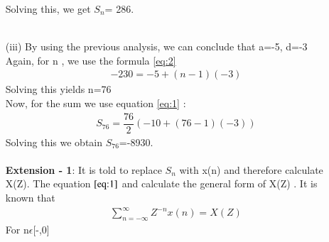 \documentclass[journal,12pt,twocolumn]{IEEEtran}
\theoremstyle{remark}
\begin{document}
\begin{enumerate}
 Solving this, we get $S_n$= 286.\\\\

\item[(iii)]  
\vspace{0.5cm}
By using the previous analysis, we can conclude that a=-5, d=-3\\
Again, for n , we use the formula \eqref{eq:2}
\begin{align}
-230= -5+(n-1)(-3)
\end{align}
Solving this yields n=76\\
Now, for the sum we use equation \eqref{eq:1} :\\
\begin{align}
    S_{76}=\dfrac{76}{2}(-10+(76-1)(-3))
    \end{align}
Solving this we obtain $S_{76}$=-8930.\\\\
\textbf{Extension - 1}:
It is told to replace $S_n$ with x(n) and therefore calculate X(Z). The equation $\eqref{eq:1}$ and calculate the general form of X(Z) .
It is known that\\
\begin{align}
 \sum_{n=-\infty}^{\infty} Z^{-n}x(n) = X(Z)\label{eq:3}
 \end{align}
For n$\epsilon$[-\infty,0] 


\end{enumerate}
\end{document}
